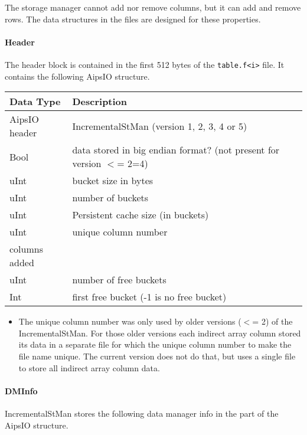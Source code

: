The storage manager cannot add nor remove columns, but it can add and
remove rows. The data structures in the files are designed for these properties.

\paragraph{Header\\}
The header block is contained in the first 512 bytes of the
\texttt{table.f<i>} file. It contains the following AipsIO structure.

\vspace{0.15in}
\begin{tabular}{|l|p{13cm}|} \hline
  Data Type & Description \\ \hline\hline
  AipsIO header & IncrementalStMan (version 1, 2, 3, 4 or 5) \\
  Bool & data stored in big endian format? (not present for version $<$= 2=4) \\
  uInt & bucket size in bytes \\
  uInt & number of buckets \\
  uInt & Persistent cache size (in buckets) \\
  uInt & unique column number \\
         columns added \\
  uInt & number of free buckets \\
  Int & first free bucket (-1 is no free bucket) \\
  \hline
\end{tabular}
\vspace{0.15in}

\begin{itemize}
\item
 The  unique column number was only used by older versions ($<$= 2)
 of the IncrementalStMan. For those older versions each indirect array
 column stored its data in a separate file for which the unique column
 number to make the file name unique.
The current version does not do that, but uses a single file to store
all indirect array column data.
\end{itemize}

\paragraph{DMInfo\\}
IncrementalStMan stores the following data manager info in the
 part of the 
 AipsIO structure.

